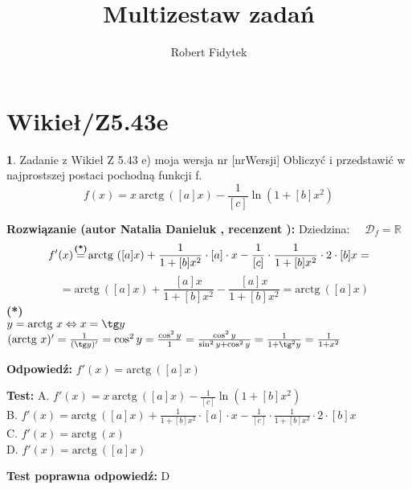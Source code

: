 \documentclass[12pt, a4paper]{article}
\title{Multizestaw zadań}
\author{Robert Fidytek}
\date{}
\theoremstyle{definition} %
\newtheorem{zad}{}
\newcommand{\kategoria}[1]{\section{#1}} %
\newcommand{\zadStart}[1]{\begin{zad}#1\newline} %
\newcommand{\zadStop}{\end{zad}}   %
\newcommand{\rozwStart}[2]{\noindent \textbf{Rozwiązanie (autor #1 , recenzent #2): }\newline} %
\newcommand{\rozwStop}{\newline}                                            %
\newcommand{\odpStart}{\noindent \textbf{Odpowiedź:}\newline}    %
\newcommand{\odpStop}{\newline}                                             %
\newcommand{\testStart}{\noindent \textbf{Test:}\newline} %
\newcommand{\testStop}{\newline} %
\newcommand{\kluczStart}{\noindent \textbf{Test poprawna odpowiedź:}\newline} %
\newcommand{\kluczStop}{\newline} %
\begin{document}
\maketitle

\kategoria{Wikieł/Z5.43e}

\zadStart{Zadanie z Wikieł Z 5.43 e) moja wersja nr [nrWersji]}
Obliczyć i przedstawić w najprostszej postaci pochodną funkcji f.
$$f(x) = x\ \text{arctg}\ ([a]x) - \frac{1}{[c]} \ln(1+[b]x^2)$$
\zadStop

\rozwStart{Natalia Danieluk}{}
Dziedzina: $\quad \mathcal{D}_f=\mathbb{R}$
$$f'(x) \mathrel{\stackrel{\makebox[0pt]{\mbox{\normalfont\scriptsize\textbf{(*)}}}}{=}}
\text{arctg}\ ([a]x) + \frac{1}{1+[b]x^2} \cdot [a] \cdot x - \frac{1}{[c]} \cdot \frac{1}{1+[b]x^2} \cdot 2 \cdot [b]x =$$
$$\quad = \text{arctg}\ ([a]x) + \frac{[a]x}{1+[b]x^2} - \frac{[a]x}{1+[b]x^2} = \text{arctg}\ ([a]x)$$
{\normalfont\scriptsize\textbf{(*)}\\
$y = \text{arctg}\ x \Leftrightarrow x = \tg y$\\
$(\text{arctg}\ x)' = \frac{1}{(\tg y)'} = \cos^2y = \frac{\cos^2y}{1} = \frac{\cos^2y}{\sin^2y + \cos^2y} = \frac{1}{1 + \tg^2y}= \frac{1}{1 + x^2}$}
\rozwStop

\odpStart
$f'(x) = \text{arctg}\ ([a]x)$
\odpStop

\testStart
A. $f'(x) = x\ \text{arctg}\ ([a]x) - \frac{1}{[c]} \ln(1+[b]x^2)$\\
B. $f'(x) = \text{arctg}\ ([a]x) + \frac{1}{1+[b]x^2} \cdot [a] \cdot x - \frac{1}{[c]} \cdot \frac{1}{1+[b]x^2} \cdot 2 \cdot [b]x$\\
C. $f'(x) = \text{arctg}\ (x)$\\
D. $f'(x) = \text{arctg}\ ([a]x)$
\testStop

\kluczStart
D
\kluczStop
\end{document}
